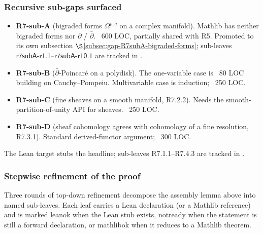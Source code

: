 \subsubsection*{Recursive sub-gaps surfaced}

\begin{itemize}
\item \textbf{R7-sub-A} (bigraded forms \(\Omega^{p,q}\) on a complex
  manifold).  Mathlib has neither bigraded forms nor \(\partial\) /
  \(\bar\partial\).  ~600 LOC, partially shared with R5.  Promoted
  to its own subsection
  \(\S\)\ref{subsec:gap-R7subA-bigraded-forms}; sub-leaves
  \(\textsf{r7subA-r1.1}\)--\(\textsf{r7subA-r10.1}\) are tracked in
  .
\item \textbf{R7-sub-B} (\(\bar\partial\)-Poincar\'e on a polydisk).
  The one-variable case is ~80 LOC building on Cauchy--Pompeiu.
  Multivariable case is induction; ~250 LOC.
\item \textbf{R7-sub-C} (fine sheaves on a smooth manifold,
  R7.2.2).  Needs the smooth-partition-of-unity API for sheaves.
  ~250 LOC.
\item \textbf{R7-sub-D} (sheaf cohomology agrees with cohomology of a
  fine resolution, R7.3.1).  Standard derived-functor argument; ~300
  LOC.
\end{itemize}

\begin{lemma}
\label{lem:dolbeault-overview-stepwise}
The Lean target 
stubs the headline; sub-leaves R7.1.1--R7.4.3 are tracked in
.
\leanok
\end{lemma}


\subsubsection*{Stepwise refinement of the proof}

Three rounds of top-down refinement decompose the assembly
lemma above into named sub-leaves.  Each leaf carries a Lean
declaration (or a Mathlib reference) and is marked
\textsf{leanok} when the Lean stub exists, \textsf{notready}
when the statement is still a forward declaration, or
\textsf{mathlibok} when it reduces to a Mathlib theorem.

